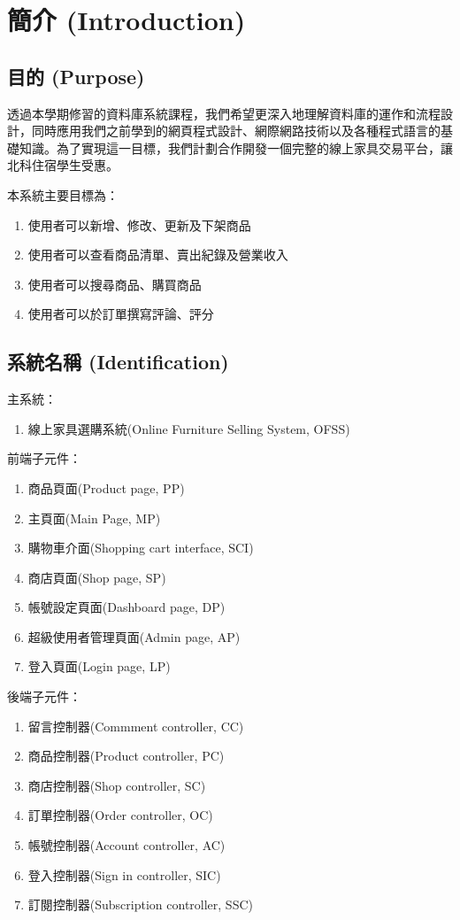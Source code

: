 \documentclass[a4paper, 12pt]{article}
\begin{document}

\section{簡介 (Introduction)}

\subsection{目的 (Purpose)}

透過本學期修習的資料庫系統課程，我們希望更深入地理解資料庫的運作和流程設計，同時應用我們之前學到的網頁程式設計、網際網路技術以及各種程式語言的基礎知識。為了實現這一目標，我們計劃合作開發一個完整的線上家具交易平台，讓北科住宿學生受惠。

本系統主要目標為：
\begin{enumerate}
  \item 使用者可以新增、修改、更新及下架商品
  \item 使用者可以查看商品清單、賣出紀錄及營業收入
  \item 使用者可以搜尋商品、購買商品
  \item 使用者可以於訂單撰寫評論、評分
\end{enumerate}

\subsection{系統名稱 (Identification)}
主系統：
\begin{enumerate}
    \item 線上家具選購系統(Online Furniture Selling System, OFSS)
\end{enumerate}
前端子元件：
\begin{enumerate}
    \item 商品頁面(Product page, PP)
    \item 主頁面(Main Page, MP)
    \item 購物車介面(Shopping cart interface, SCI)
    \item 商店頁面(Shop page, SP)
    \item 帳號設定頁面(Dashboard page, DP)
    \item 超級使用者管理頁面(Admin page, AP)
    \item 登入頁面(Login page, LP)
\end{enumerate}
後端子元件：
\begin{enumerate}
  \item 留言控制器(Commment controller, CC)
  \item 商品控制器(Product controller, PC)
  \item 商店控制器(Shop controller, SC)
  \item 訂單控制器(Order controller, OC)
  \item 帳號控制器(Account controller, AC)
  \item 登入控制器(Sign in controller, SIC)
  \item 訂閱控制器(Subscription controller, SSC)
\end{enumerate}
\end{document}
